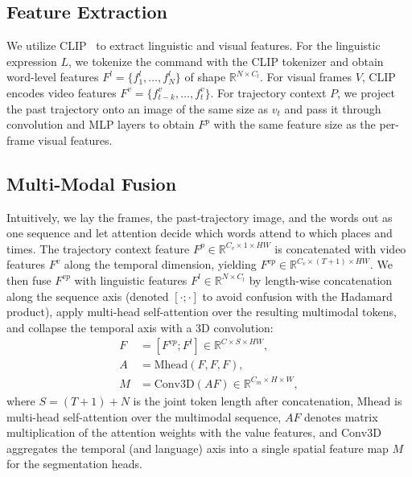 \subsection{Feature Extraction}

We utilize CLIP~\cite{radford2021learning} to extract linguistic and visual features. For the linguistic expression $L$, we tokenize the command with the CLIP tokenizer and obtain word-level features $F^l = \{f^{l}_{1}, \ldots, f^{l}_{N}\}$ of shape $\mathbb{R}^{N \times C_l}$. For visual frames $V$, CLIP encodes video features $F^v=\{f^{v}_{t-k}, \ldots, f^{v}_{t}\}$. For trajectory context $P$, we project the past trajectory onto an image of the same size as $v_t$ and pass it through convolution and MLP layers to obtain $F^p$ with the same feature size as the per-frame visual features.

\subsection{Multi-Modal Fusion}

Intuitively, we lay the frames, the past-trajectory image, and the words out as one sequence and let attention decide which words attend to which places and times. The trajectory context feature $F^p \in \mathbb{R}^{C_v \times 1 \times HW}$ is concatenated with video features $F^v$ along the temporal dimension, yielding $F^{vp} \in \mathbb{R}^{C_v \times (T+1) \times HW}$. We then fuse $F^{vp}$ with linguistic features $F^l \in \mathbb{R}^{N \times C_l}$ by length-wise concatenation along the sequence axis (denoted $[\cdot;\cdot]$ to avoid confusion with the Hadamard product), apply multi-head self-attention over the resulting multimodal tokens, and collapse the temporal axis with a 3D convolution:
\begin{equation} \label{eq:vln_attention}
\begin{split}
    F &= [F^{vp}; F^l] \in \mathbb{R}^{C \times S \times HW}, \\
    A &= \mathrm{Mhead}(F, F, F), \\
    M &= \mathrm{Conv3D}(A F) \in \mathbb{R}^{C_m \times H \times W},
\end{split}
\end{equation}
where $S = (T{+}1) + N$ is the joint token length after concatenation, $\mathrm{Mhead}$ is multi-head self-attention over the multimodal sequence, $A F$ denotes matrix multiplication of the attention weights with the value features, and $\mathrm{Conv3D}$ aggregates the temporal (and language) axis into a single spatial feature map $M$ for the segmentation heads.

